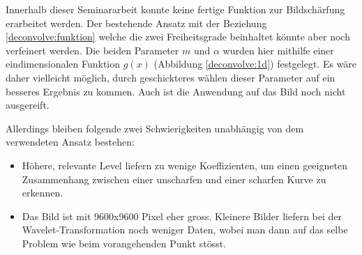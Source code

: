 Innerhalb dieser Seminararbeit konnte keine fertige Funktion zur Bildschärfung erarbeitet werden.
Der bestehende Ansatz mit der Beziehung \eqref{deconvolve:funktion} welche die zwei Freiheitsgrade beinhaltet könnte aber noch verfeinert werden.
Die beiden Parameter $m$ und $\alpha$ wurden hier mithilfe einer eindimensionalen Funktion $g(x)$ (Abbildung \ref{deconvolve:1d}) festgelegt.
Es wäre daher vielleicht möglich, durch geschickteres wählen dieser Parameter auf ein besseres Ergebnis zu kommen.
Auch ist die Anwendung auf das Bild noch nicht ausgereift.

Allerdings bleiben folgende zwei Schwierigkeiten unabhängig von dem verwendeten Ansatz bestehen:
\begin{itemize}
	\item Höhere, relevante Level liefern zu wenige Koeffizienten, um einen geeigneten Zusammenhang zwischen einer unscharfen und einer scharfen Kurve zu erkennen.
	\item Das Bild ist mit 9600x9600 Pixel eher gross. Kleinere Bilder liefern bei der Wavelet-Transformation noch weniger Daten, wobei man dann auf das selbe Problem wie beim vorangehenden Punkt stösst.
\end{itemize}
